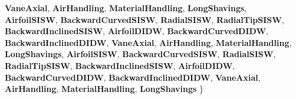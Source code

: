 \begin{DoxyCompactItemize}
\newline
{\bfseries Vane\+Axial}, 
{\bfseries Air\+Handling}, 
{\bfseries Material\+Handling}, 
{\bfseries Long\+Shavings}, 
\newline
{\bfseries Airfoil\+S\+I\+SW}, 
{\bfseries Backward\+Curved\+S\+I\+SW}, 
{\bfseries Radial\+S\+I\+SW}, 
{\bfseries Radial\+Tip\+S\+I\+SW}, 
\newline
{\bfseries Backward\+Inclined\+S\+I\+SW}, 
{\bfseries Airfoil\+D\+I\+DW}, 
{\bfseries Backward\+Curved\+D\+I\+DW}, 
{\bfseries Backward\+Inclined\+D\+I\+DW}, 
\newline
{\bfseries Vane\+Axial}, 
{\bfseries Air\+Handling}, 
{\bfseries Material\+Handling}, 
{\bfseries Long\+Shavings}, 
\newline
{\bfseries Airfoil\+S\+I\+SW}, 
{\bfseries Backward\+Curved\+S\+I\+SW}, 
{\bfseries Radial\+S\+I\+SW}, 
{\bfseries Radial\+Tip\+S\+I\+SW}, 
\newline
{\bfseries Backward\+Inclined\+S\+I\+SW}, 
{\bfseries Airfoil\+D\+I\+DW}, 
{\bfseries Backward\+Curved\+D\+I\+DW}, 
{\bfseries Backward\+Inclined\+D\+I\+DW}, 
\newline
{\bfseries Vane\+Axial}, 
{\bfseries Air\+Handling}, 
{\bfseries Material\+Handling}, 
{\bfseries Long\+Shavings}
 \}
\end{DoxyCompactItemize}
